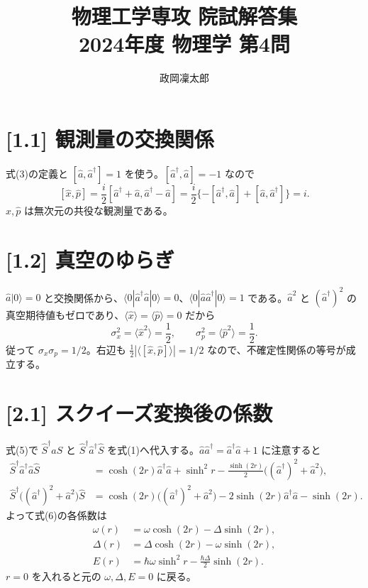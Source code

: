 \documentclass[11pt,a4paper]{article}
\title{物理工学専攻 院試解答集\\2024年度 物理学 第4問}
\author{政岡凜太郎}
\date{}
\begin{document}
\maketitle

\section*{[1.1] 観測量の交換関係}
式(3)の定義と $[\hat a,\hat a^\dagger]=1$ を使う。$[\hat a^\dagger,\hat a]=-1$ なので
\[
[\hat x,\hat p]
=\frac{i}{2}[\hat a^\dagger+\hat a,\hat a^\dagger-\hat a]
=\frac{i}{2}\{-[\hat a^\dagger,\hat a]+[\hat a,\hat a^\dagger]\}
=\boxed{i}.
\]
$\hat x,\hat p$ は無次元の共役な観測量である。

\section*{[1.2] 真空のゆらぎ}
$\hat a|0\rangle=0$ と交換関係から、$\langle0|\hat a^\dagger\hat a|0\rangle=0$、$\langle0|\hat a\hat a^\dagger|0\rangle=1$ である。$\hat a^2$ と $(\hat a^\dagger)^2$ の真空期待値もゼロであり、$\langle\hat x\rangle=\langle\hat p\rangle=0$ だから
\[
\sigma_x^2=\langle\hat x^2\rangle=\frac12,
\qquad
\sigma_p^2=\langle\hat p^2\rangle=\frac12.
\]
従って $\boxed{\sigma_x\sigma_p=1/2}$。右辺も $\frac12|\langle[\hat x,\hat p]\rangle|=1/2$ なので、不確定性関係の等号が成立する。

\section*{[2.1] スクイーズ変換後の係数}
式(5)で $\hat S^\dagger\hat a\hat S$ と $\hat S^\dagger\hat a^\dagger\hat S$ を式(1)へ代入する。$\hat a\hat a^\dagger=\hat a^\dagger\hat a+1$ に注意すると
\begin{align*}
\hat S^\dagger\hat a^\dagger\hat a\hat S
&=\cosh(2r)\hat a^\dagger\hat a+\sinh^2r
-\frac{\sinh(2r)}2\bigl((\hat a^\dagger)^2+\hat a^2\bigr),\\
\hat S^\dagger\bigl((\hat a^\dagger)^2+\hat a^2\bigr)\hat S
&=\cosh(2r)\bigl((\hat a^\dagger)^2+\hat a^2\bigr)
-2\sinh(2r)\hat a^\dagger\hat a-\sinh(2r).
\end{align*}
よって式(6)の各係数は
\begin{align*}
\boxed{\omega(r)}&=\boxed{\omega\cosh(2r)-\Delta\sinh(2r)},\\
\boxed{\Delta(r)}&=\boxed{\Delta\cosh(2r)-\omega\sinh(2r)},\\
\boxed{E(r)}&=\boxed{\hbar\omega\sinh^2r-\frac{\hbar\Delta}{2}\sinh(2r)}.
\end{align*}
$r=0$ を入れると元の $\omega,\Delta,E=0$ に戻る。
\end{document}
